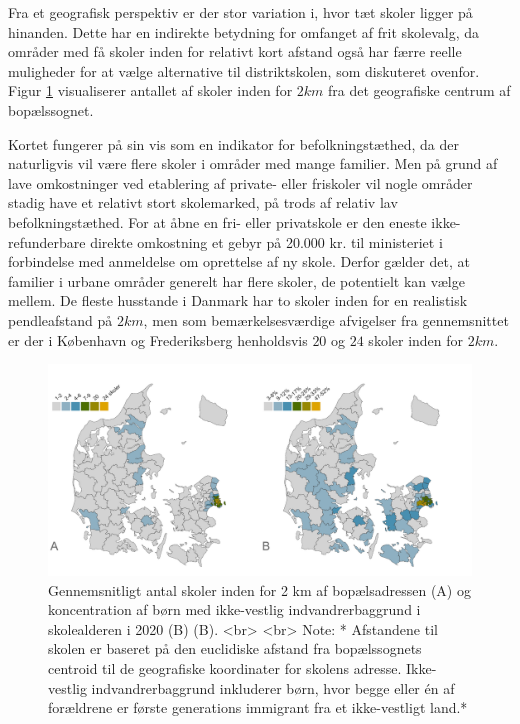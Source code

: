 \documentclass[
]{book}
\begin{document}
Fra et geografisk perspektiv er der stor variation i, hvor tæt skoler ligger på hinanden. Dette har en indirekte betydning for omfanget af frit skolevalg, da områder med få skoler inden for relativt kort afstand også har færre reelle muligheder for at vælge alternative til distriktskolen, som diskuteret ovenfor. Figur \ref{fig:fig-3-1} visualiserer antallet af skoler inden for \(2 km\) fra det geografiske centrum af bopælssognet.

Kortet fungerer på sin vis som en indikator for befolkningstæthed, da der naturligvis vil være flere skoler i områder med mange familier. Men på grund af lave omkostninger ved etablering af private- eller friskoler vil nogle områder stadig have et relativt stort skolemarked, på trods af relativ lav befolkningstæthed. For at åbne en fri- eller privatskole er den eneste ikke-refunderbare direkte omkostning et gebyr på 20.000 kr. til ministeriet i forbindelse med anmeldelse om oprettelse af ny skole. Derfor gælder det, at familier i urbane områder generelt har flere skoler, de potentielt kan vælge mellem. De fleste husstande i Danmark har to skoler inden for en realistisk pendleafstand på \(2 km\), men som bemærkelsesværdige afvigelser fra gennemsnittet er der i København og Frederiksberg henholdsvis \(20\) og \(24\) skoler inden for \(2 km\).

\begin{figure}
\includegraphics[width=1\linewidth]{images/figur_3_1c_distance_antal} \caption{Gennemsnitligt antal skoler inden for 2 km af bopælsadressen (A) og koncentration af børn med ikke-vestlig indvandrerbaggrund i skolealderen i 2020 (B) (B). <br> <br> Note: * Afstandene til skolen er baseret på den euclidiske afstand fra bopælssognets centroid til de geografiske koordinater for skolens adresse. Ikke-vestlig indvandrerbaggrund inkluderer børn, hvor begge eller én af forældrene er første generations immigrant fra et ikke-vestligt land.*}\label{fig:fig-3-1}
\end{figure}
\end{document}
